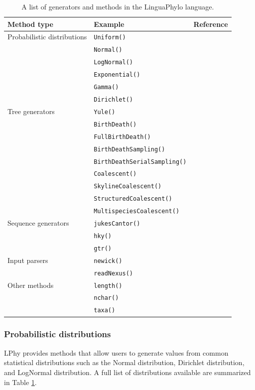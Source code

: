 \documentclass[10pt,letterpaper,table]{article}
\begin{document}
\begin{table}[h]
  \caption{A list of generators and methods in the LinguaPhylo language.}
  \begin{tabular}{|l|l|l|}
    \hline
    Method type & Example & Reference \\\hline
    Probabilistic distributions & \texttt{Uniform()} &\\
              & \texttt{Normal()} &\\
              & \texttt{LogNormal()} &\\
              & \texttt{Exponential()} &\\
              & \texttt{Gamma()} &\\
              & \texttt{Dirichlet()} &\\ \hline
    Tree generators & \texttt{Yule()} & \cite{yule1925ii}\\
              & \texttt{BirthDeath()} &\\
              & \texttt{FullBirthDeath()} &\\
              & \texttt{BirthDeathSampling()} &\\
              & \texttt{BirthDeathSerialSampling()} & \cite{stadler2013dating}\\
              & \texttt{Coalescent()} & \cite{kingman82}\\
              & \texttt{SkylineCoalescent()} & \cite{pybus00,drummond2005bayesiansequences}\\
              & \texttt{StructuredCoalescent()} &\\
              & \texttt{MultispeciesCoalescent()} &\\\hline
    Sequence generators & \texttt{jukesCantor()} & \cite{jc69}\\
              & \texttt{hky()} & \cite{hky}\\
              & \texttt{gtr()} & \cite{gtr}\\ \hline
    Input parsers & \texttt{newick()} &\\
              & \texttt{readNexus()} &\\\hline
    Other methods & \texttt{length()} &\\
    & \texttt{nchar()} &\\
    & \texttt{taxa()} &\\ \hline
  \end{tabular}
  \label{tab:generators}
\end{table}


\subsubsection*{Probabilistic distributions}
LPhy provides methods that allow users to generate values from common statistical distributions such as the Normal distribution, Dirichlet distribution, and LogNormal distribution. 
A full list of distributions available are summarized in Table \ref{tab:generators}. 
\end{document}
